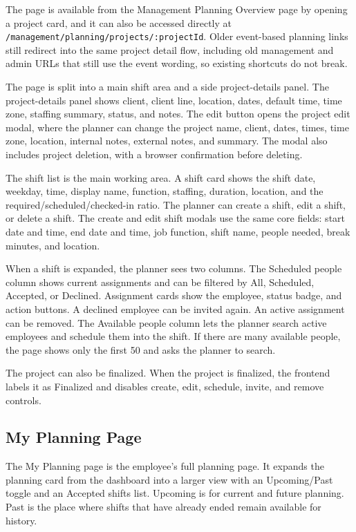 \documentclass[11pt]{article}
\newcommand{\code}[1]{\nolinkurl{#1}}
\begin{document}
The page is available from the Management Planning Overview page by opening a project card, and it can also be accessed directly at \code{/management/planning/projects/:projectId}. Older event-based planning links still redirect into the same project detail flow, including old management and admin URLs that still use the event wording, so existing shortcuts do not break.

The page is split into a main shift area and a side project-details panel. The project-details panel shows client, client line, location, dates, default time, time zone, staffing summary, status, and notes. The edit button opens the project edit modal, where the planner can change the project name, client, dates, times, time zone, location, internal notes, external notes, and summary. The modal also includes project deletion, with a browser confirmation before deleting.

The shift list is the main working area. A shift card shows the shift date, weekday, time, display name, function, staffing, duration, location, and the required/scheduled/checked-in ratio. The planner can create a shift, edit a shift, or delete a shift. The create and edit shift modals use the same core fields: start date and time, end date and time, job function, shift name, people needed, break minutes, and location.

When a shift is expanded, the planner sees two columns. The Scheduled people column shows current assignments and can be filtered by All, Scheduled, Accepted, or Declined. Assignment cards show the employee, status badge, and action buttons. A declined employee can be invited again. An active assignment can be removed. The Available people column lets the planner search active employees and schedule them into the shift. If there are many available people, the page shows only the first 50 and asks the planner to search.

The project can also be finalized. When the project is finalized, the frontend labels it as Finalized and disables create, edit, schedule, invite, and remove controls.

\subsection{My Planning Page}

The My Planning page is the employee's full planning page. It expands the planning card from the dashboard into a larger view with an Upcoming/Past toggle and an Accepted shifts list. Upcoming is for current and future planning. Past is the place where shifts that have already ended remain available for history.
\end{document}
